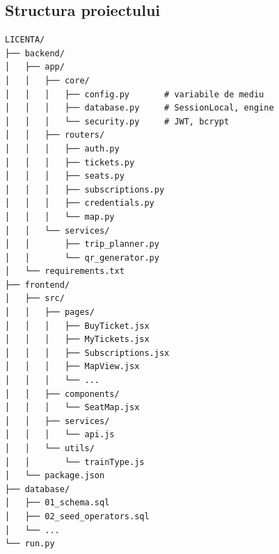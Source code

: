 \documentclass[12pt,a4paper]{report}
\begin{document}
\begin{appendices}
\chapter{Structura proiectului}

\begin{lstlisting}[caption=Structura directoarelor proiectului]
LICENTA/
├── backend/
│   ├── app/
│   │   ├── core/
│   │   │   ├── config.py       # variabile de mediu
│   │   │   ├── database.py     # SessionLocal, engine
│   │   │   └── security.py     # JWT, bcrypt
│   │   ├── routers/
│   │   │   ├── auth.py
│   │   │   ├── tickets.py
│   │   │   ├── seats.py
│   │   │   ├── subscriptions.py
│   │   │   ├── credentials.py
│   │   │   └── map.py
│   │   └── services/
│   │       ├── trip_planner.py
│   │       └── qr_generator.py
│   └── requirements.txt
├── frontend/
│   ├── src/
│   │   ├── pages/
│   │   │   ├── BuyTicket.jsx
│   │   │   ├── MyTickets.jsx
│   │   │   ├── Subscriptions.jsx
│   │   │   ├── MapView.jsx
│   │   │   └── ...
│   │   ├── components/
│   │   │   └── SeatMap.jsx
│   │   ├── services/
│   │   │   └── api.js
│   │   └── utils/
│   │       └── trainType.js
│   └── package.json
├── database/
│   ├── 01_schema.sql
│   ├── 02_seed_operators.sql
│   └── ...
└── run.py
\end{lstlisting}

\end{appendices}
\end{document}
